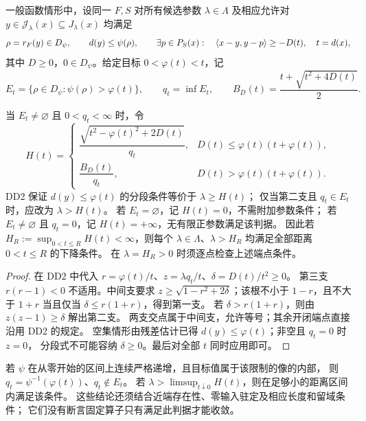 一般函数情形中，设同一 $F,S$ 对所有候选参数 $\lambda\in\Lambda$
及相应允许对 $y\in\mathcal J_\lambda(x)\subseteq J_\lambda(x)$ 均满足
\[
 \rho=r_F(y)\in D_\psi,\qquad d(y)\le\psi(\rho),\qquad
 \exists p\in P_S(x):\quad\langle x-y,y-p\rangle\ge-D(t),\quad t=d(x),
\]
其中 $D\ge0$，$0\in D_\psi$。给定目标 $0<\varphi(t)<t$，记
\begin{equation}\label{eq:parameters-bad-layer}
 E_t=\{\rho\in D_\psi:\psi(\rho)>\varphi(t)\},\qquad
 q_t=\inf E_t,\qquad B_D(t)=\frac{t+\sqrt{t^2+4D(t)}}2.
\end{equation}

\begin{theorem}[DD2 的参数条件]\label{thm:parameters-dd2}
当 $E_t\ne\varnothing$ 且 $0<q_t<\infty$ 时，令
\begin{equation}\label{eq:parameters-general-threshold}
 H(t)=
 \begin{cases}
 \dfrac{\sqrt{t^2-\varphi(t)^2+2D(t)}}{q_t},
 &D(t)\le\varphi(t)(t+\varphi(t)),\\[6pt]
 \dfrac{B_D(t)}{q_t},&D(t)>\varphi(t)(t+\varphi(t)).
 \end{cases}
\end{equation}
DD2 保证 $d(y)\le\varphi(t)$ 的分段条件等价于 $\lambda\ge H(t)$；
仅当第二支且 $q_t\in E_t$ 时，应改为 $\lambda>H(t)$。
若 $E_t=\varnothing$，记 $H(t)=0$，不需附加参数条件；
若 $E_t\ne\varnothing$ 且 $q_t=0$，记 $H(t)=+\infty$，无有限正参数满足该判据。
因此若 $H_R:=\sup_{0<t\le R}H(t)<\infty$，则每个
$\lambda\in\Lambda$、$\lambda>H_R$ 均满足全部距离 $0<t\le R$ 的下降条件。
在 $\lambda=H_R>0$ 时须逐点检查上述端点条件。
\end{theorem}

\begin{proof}
在 DD2 中代入 $r=\varphi(t)/t$、$z=\lambda q_t/t$、$\delta=D(t)/t^2\ge0$。
第三支 $r(r-1)<0$ 不适用。中间支要求
$z\ge\sqrt{1-r^2+2\delta}$；该根不小于 $1-r$，且不大于 $1+r$
当且仅当 $\delta\le r(1+r)$，得到第一支。
若 $\delta>r(1+r)$，则由 $z(z-1)\ge\delta$ 解出第二支。
两支交点属于中间支，允许等号；其余开闭端点直接沿用 DD2 的规定。
空集情形由残差估计已得 $d(y)\le\varphi(t)$；非空且 $q_t=0$ 时 $z=0$，
分段式不可能容纳 $\delta\ge0$。最后对全部 $t$ 同时应用即可。
\end{proof}

若 $\psi$ 在从零开始的区间上连续严格递增，且目标值属于该限制的像的内部，
则 $q_t=\psi^{-1}(\varphi(t))$、$q_t\notin E_t$。
若 $\lambda>\limsup_{t\downarrow0}H(t)$，则在足够小的距离区间内满足该条件。
这些结论还须结合近端存在性、零输入驻定及相应长度和留域条件；
它们没有断言固定算子只有满足此判据才能收敛。


